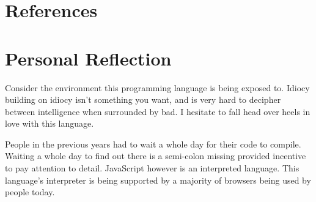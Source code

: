 \documentclass[12pt]{scrreprt}
\begin{document}
\chapter{References}



\chapter{Personal Reflection}

	Consider the environment this programming language is being exposed to. Idiocy building on idiocy isn’t something you want, and is very hard to decipher between intelligence when surrounded by bad. I hesitate to fall head over heels in love with this language.

	People in the previous years had to wait a whole day for their code to compile. Waiting a whole day to find out there is a semi-colon missing provided incentive to pay attention to detail. JavaScript however is an interpreted language. This language’s interpreter is being supported by a majority of browsers being used by people today.
\end{document}
